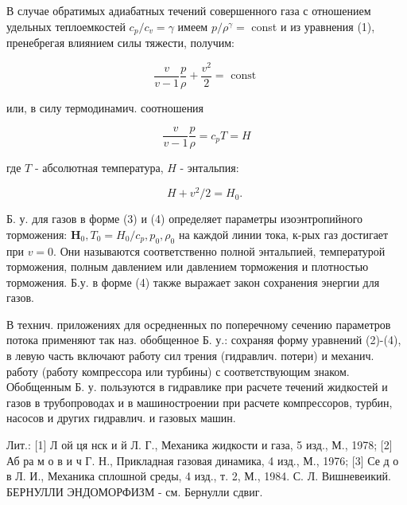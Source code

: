 \documentclass[10pt]{article}
\begin{document}
В случае обратимых адиабатных течений совершенного газа с отношением удельных теплоемкостей $c_{p} / c_{v}=\gamma$ имеем $p / \rho^{\gamma}=$ const и из уравнения (1), пренебрегая влиянием силы тяжести, получим:



\[

\frac{v}{v-1} \frac{p}{\rho}+\frac{v^{2}}{2}=\text { const }

\]



или, в силу термодинамич. соотношения



\[

\frac{v}{v-1} \frac{p}{\rho}=c_{p} T=H

\]



где $T$ - абсолютная температура, $H$ - энтальпия:



\[

H+v^{2} / 2=H_{0} \text {. }

\]



Б. у. для газов в форме (3) и (4) определяет параметры изоэнтропийного торможения: $\boldsymbol{H}_{0}, T_{0}=H_{0} / c_{p}, p_{0}, \rho_{0}$ на каждой линии тока, к-рых газ достигает при $v=0$. Они называются соответственно полной энтальпией, температурой торможения, полным давлением или давлением торможения и плотностью торможения. Б.у. в форме (4) также выражает закон сохранения энергии для газов.



В технич. приложениях для осредненных по поперечному сечению параметров потока применяют так наз. обобщенное Б. у.: сохраняя форму уравнений (2)-(4), в левую часть включают работу сил трения (гидравлич. потери) и механич. работу (работу компрессора или турбины) с соответствующим знаком. Обобщенным Б. у. пользуются в гидравлике при расчете течений жидкостей и газов в трубопроводах и в машиностроении при расчете компрессоров, турбин, насосов и других гидравлич. и газовых машин.



Лит.: [1] Л ой ця нск и й Л. Г., Механика жидкости и газа, 5 изд., М., 1978; [2] Аб ра м о в и ч Г. Н., Прикладная газовая динамика, 4 изд., М., 1976; [3] Се д о в Л. И., Механика сплошной среды, 4 изд., т. 2, М., 1984. С. Л. Вишневеикий. БЕРНУЛЛИ ЭНДОМОРФИЗМ - см. Бернулли сдвиг.
\end{document}
